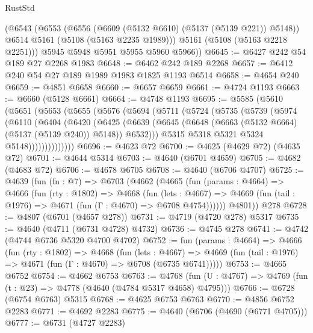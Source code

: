 \begin{lexlean}{RustStd}
\begin{coremodule}
        (@6543
          (@6553
            (@6556 (@6609 (@5132 @6610) (@5137 (@5139 @221)) @5148))
            @6514
            @5161
            (@5108 (@5163 @2235 @1989)))
          @5161
          (@5108 (@5163 @2218 @2251)))
        @5945
        @5948
        @5951
        @5955
        @5960
        @5966))
@6645 := @6427 @242 @54 @189 @27 @2268 @1983
@6648 := @6462 @242 @189 @2268
@6657 := @6412 @240 @54 @27 @189 @1989 @1983 @1825 @1193 @6514
@6658 := @4654 @240
@6659 := @4851 @6658
@6660 := @6657 @6659
@6661 := @4724 @1193
@6663 := @6660 (@5128 @6661)
@6664 := @4748 @1193
@6695 := @5585
    (@5610
      (@5651
        (@5653
          (@5655
            (@5676
              (@5694
                (@5711
                  (@5724
                    (@5735
                      (@5739
                        (@5974
                          (@6110
                            (@6404
                              (@6420
                                (@6425
                                  (@6639
                                    (@6645
                                      (@6648 (@6663 (@5132 @6664) (@5137 (@5139 @240)) @5148))
                                      @6532)))
                                @5315
                                @5318
                                @5321
                                @5324
                                @5148))))))))))))))
@6696 := @4623 @72
@6700 := @4625 (@4629 @72) (@4635 @72)
@6701 := @4644 @5314
@6703 := @4640 (@6701 @4659)
@6705 := @4682 (@4683 @72)
@6706 := @4678 @6705
@6708 := @4640 (@6706 @4707)
@6725 := @4639
    (fun (fn : @7) =>
    @6703
      (@4662
        (@4665
          (fun (params : @4664) =>
          @4666
            (fun (rty : @1802) =>
            @4668
              (fun (lets : @4667) =>
              @4669 (fun (tail : @1976) => @4671 (fun (Γ : @4670) => @6708 @4754))))))
        @4801))
    @278
@6728 := @4807 (@6701 (@4657 @278))
@6731 := @4719 (@4720 @278) @5317
@6735 := @4640 (@4711 (@6731 @4728) @4732)
@6736 := @4745 @278
@6741 := @4742 (@4744 @6736 @5320 @4700 @4702)
@6752 := fun (params : @4664) =>
  @4666
    (fun (rty : @1802) =>
    @4668
      (fun (lets : @4667) =>
      @4669 (fun (tail : @1976) => @4671 (fun (Γ : @4670) => @6708 (@6735 @6741)))))
@6753 := @4665 @6752
@6754 := @4662 @6753
@6763 := @4768 (fun (U : @4767) => @4769 (fun (t : @23) => @4778 (@4640 (@4784 @5317 @4658) @4795)))
@6766 := @6728 (@6754 @6763) @5315
@6768 := @4625 @6753 @6763
@6770 := @4856 @6752 @2283
@6771 := @4692 @2283
@6775 := @4640 (@6706 (@4690 (@6771 @4705)))
@6777 := @6731 (@4727 @2283)

\end{coremodule}
\end{lexlean}
